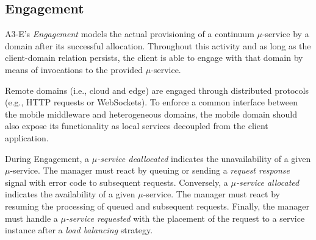 



\subsection{Engagement}\label{sec:A3-E-engagement}

A3-E's \textit{Engagement} models the actual provisioning of a continuum $\mu$-service by a domain after its successful allocation.
Throughout this activity and as long as the client-domain relation persists, the client is able to engage with that domain by means of invocations to the provided $\mu$-service. 

Remote domains (i.e., cloud and edge) are engaged through distributed protocols (e.g., HTTP requests or WebSockets). To enforce a common interface between the mobile middleware and heterogeneous domains, the mobile domain should also expose its functionality as local services decoupled from the client application.

During Engagement, a \textit{$\mu$-service deallocated} indicates the unavailability of a given $\mu$-service. The manager must react by queuing or sending a \textit{request response} signal with error code to subsequent requests. Conversely, a \textit{$\mu$-service allocated} indicates the availability of a given $\mu$-service. The manager must react by resuming the processing of queued and subsequent requests. Finally, the manager must handle a \textit{$\mu$-service requested} with the placement of the request to a service instance after a \textit{load balancing} strategy.



